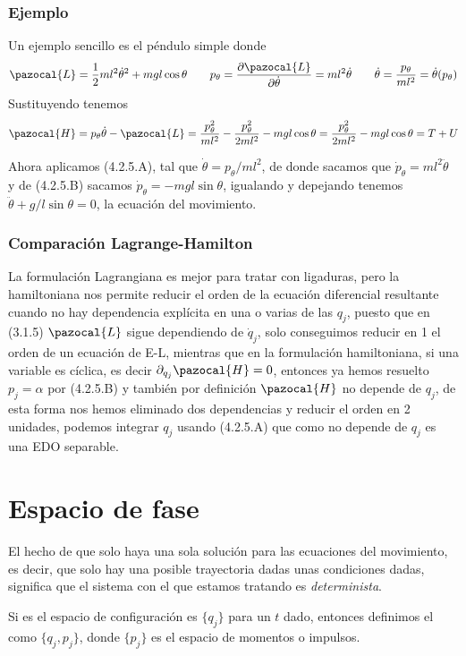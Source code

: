 \subsubsection{Ejemplo}
Un ejemplo sencillo es el péndulo simple donde 
\[\pazocal{L}=\frac{1}{2}ml^2\dot{\theta}^2+mgl\cos{\theta} \ \ \ \ \ \ p_\theta = \frac{\partial \pazocal{L}}{\partial \dot{\theta}}=ml^2\dot{\theta} \ \ \ \ \ \ \dot{\theta}=\frac{p_\theta}{ml^2}=\dot{\theta}(p_\theta)\]
Sustituyendo tenemos 
\[\pazocal{H}=p_\theta \dot{\theta} -\pazocal{L}=\frac{p_\theta^2}{ml^2} - \frac{p_\theta^2}{2ml^2}-mgl\cos\theta = \frac{p_\theta^2}{2ml^2}-mgl\cos\theta = T+U\]

Ahora aplicamos (4.2.5.A), tal que $\dot{\theta} = p_\theta/ml^2$, de donde sacamos que $\dot{p}_\theta=ml^2 \ddot{\theta}$ y de (4.2.5.B) sacamos $\dot{p}_\theta=-mgl\sin\theta$, igualando y depejando tenemos $\ddot{\theta} + g/l \sin\theta = 0$, la ecuación del movimiento.
\subsubsection{Comparación Lagrange-Hamilton}
La formulación Lagrangiana es mejor para tratar con ligaduras, pero la hamiltoniana nos permite reducir el orden de la ecuación diferencial resultante cuando no hay dependencia explícita en una o varias de las $q_j$, puesto que en (3.1.5) $  \pazocal{L}$ sigue dependiendo de $\dot{q}_j$, solo conseguimos reducir en 1 el orden de un ecuación de E-L, mientras que en la formulación hamiltoniana, si una variable es cíclica, es decir $\partial_{q_j}\pazocal{H}=0$, entonces ya hemos resuelto $p_j=\alpha$ por (4.2.5.B) y también por definición $\pazocal{H}$ no depende de $q_j$, de esta forma nos hemos eliminado dos dependencias y reducir el orden en 2 unidades, podemos integrar $q_j$ usando (4.2.5.A) que como no depende de $q_j$ es una EDO separable. 
\section{Espacio de fase} 
El hecho de que solo haya una sola solución para las ecuaciones del movimiento, es decir, que solo hay una posible trayectoria dadas unas condiciones dadas, significa que el sistema con el que estamos tratando es \textit{determinista}.

Si es el espacio de configuración es $\{q_j\}$ para un $t$ dado, entonces definimos el  como $\{q_j,p_j\}$, donde $\{p_j\}$ es el espacio de momentos o impulsos.

